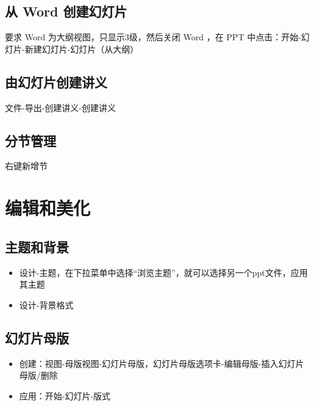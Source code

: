 \documentclass[]{ctexbook}
\providecommand{\tightlist}{%
  \setlength{\itemsep}{0pt}\setlength{\parskip}{0pt}}
\begin{document}
\hypertarget{ux4ece-word-ux521bux5efaux5e7bux706fux7247}{%
\section{从 Word 创建幻灯片}\label{ux4ece-word-ux521bux5efaux5e7bux706fux7247}}

要求 Word 为大纲视图，只显示3级，然后关闭 Word ，在 PPT 中点击：开始-幻灯片-新建幻灯片-幻灯片（从大纲）

\hypertarget{ux7531ux5e7bux706fux7247ux521bux5efaux8bb2ux4e49}{%
\section{由幻灯片创建讲义}\label{ux7531ux5e7bux706fux7247ux521bux5efaux8bb2ux4e49}}

文件-导出-创建讲义-创建讲义

\hypertarget{ux5206ux8282ux7ba1ux7406}{%
\section{分节管理}\label{ux5206ux8282ux7ba1ux7406}}

右键新增节

\hypertarget{ux7f16ux8f91ux548cux7f8eux5316}{%
\chapter{编辑和美化}\label{ux7f16ux8f91ux548cux7f8eux5316}}

\hypertarget{ux4e3bux9898ux548cux80ccux666f}{%
\section{主题和背景}\label{ux4e3bux9898ux548cux80ccux666f}}

\begin{itemize}
\tightlist
\item
  设计-主题，在下拉菜单中选择``浏览主题''，就可以选择另一个ppt文件，应用其主题
\item
  设计-背景格式
\end{itemize}

\hypertarget{ux5e7bux706fux7247ux6bcdux7248}{%
\section{幻灯片母版}\label{ux5e7bux706fux7247ux6bcdux7248}}

\begin{itemize}
\tightlist
\item
  创建：视图-母版视图-幻灯片母版，幻灯片母版选项卡-编辑母版-插入幻灯片母版/删除
\item
  应用：开始-幻灯片-版式
\end{itemize}
\end{document}

